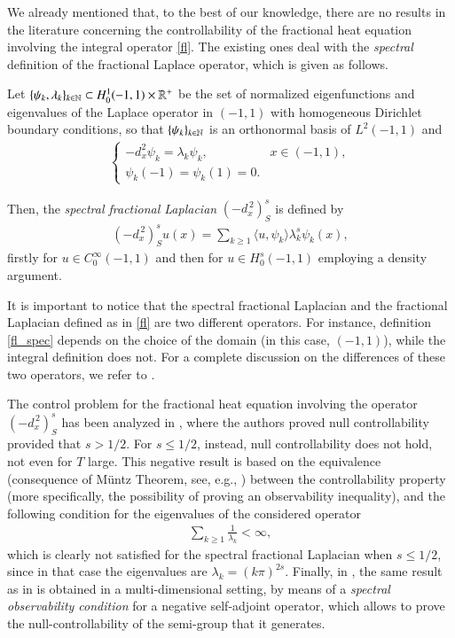 We already mentioned that, to the best of our knowledge, there are no results in the literature concerning the controllability of the fractional heat equation involving the integral operator \eqref{fl}. The existing ones deal with the \textit{spectral} definition of the fractional Laplace operator, which is given as follows.

Let $\{\psi_k,\lambda_k\}_{k\in\mathbb{N}}\subset H_0^1(-1,1)\times\mathbb{R}^+$ be the set of normalized eigenfunctions and eigenvalues of the Laplace operator in $(-1,1)$ with homogeneous Dirichlet boundary conditions, so that $\{\psi_k\}_{k\in\mathbb{N}}$ is an orthonormal basis of $L^2(-1,1)$ and         
\begin{align*}
	\begin{cases}
		-d_x^2\psi_k =\lambda_k\psi_k, & x\in (-1,1), 
		\\
		\psi_k(-1)=\psi_k(1)=0.
	\end{cases}
\end{align*}

Then, the \textit{spectral fractional Laplacian} $(-d_x^{\,2})^s_S$ is defined by
\begin{align}\label{fl_spec}
	(-d_x^{\,2})^s_S u(x) = \sum_{k\geq 1}\langle u,\psi_k\rangle \lambda_k^s\psi_k(x),
\end{align}
firstly for $u\in C_0^{\infty}(-1,1)$ and then for $u\in H_0^s(-1,1)$ employing a density argument.

It is important to notice that the spectral fractional Laplacian and the fractional Laplacian defined as in \eqref{fl} are two different operators. For instance, definition \eqref{fl_spec} depends on the choice of the domain (in this case, $(-1,1)$), while the integral definition does not. For a complete discussion on the differences of these two operators, we refer to \cite{servadei2014spectrum}.

The control problem for the fractional heat equation involving the operator $(-d_x^{\,2})^s_S$ has been analyzed in \cite{micu2006controllability}, where the authors proved null controllability provided that $s>1/2$. For $s\leq 1/2$, instead, null controllability does not hold, not even for $T$ large. This negative result is based on the equivalence (consequence of M\"untz Theorem, see, e.g., \cite[Page 24]{schwartz1958etude}) between the controllability property (more specifically, the possibility of proving an observability inequality), and the following condition for the eigenvalues of the considered operator 
\begin{align}\label{eigen_cond}
	\sum_{k\geq 1} \frac{1}{\lambda_k}<\infty,
\end{align} 
which is clearly not satisfied for the spectral fractional Laplacian when $s\leq 1/2$, since in that case the eigenvalues are $\lambda_k = (k\pi)^{2s}$. Finally, in \cite{miller2006controllability}, the same result as in \cite{micu2006controllability} is obtained in a multi-dimensional setting, by means of a  \textit{spectral observability condition} for a negative self-adjoint operator, which allows to prove the null-controllability of the semi-group that it generates.

